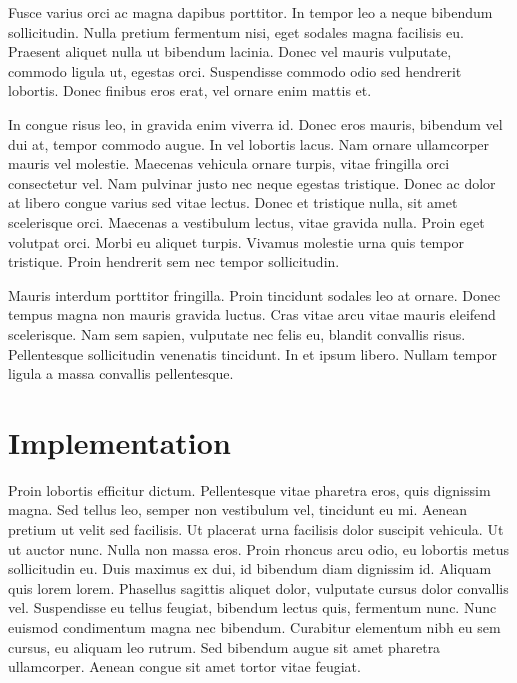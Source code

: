 \documentclass{article}
\begin{document}
Fusce varius orci ac magna dapibus porttitor. In tempor leo a neque bibendum sollicitudin. Nulla pretium fermentum nisi, eget sodales magna facilisis eu. Praesent aliquet nulla ut bibendum lacinia. Donec vel mauris vulputate, commodo ligula ut, egestas orci. Suspendisse commodo odio sed hendrerit lobortis. Donec finibus eros erat, vel ornare enim mattis et.

\begin{question}
	In congue risus leo, in gravida enim viverra id. Donec eros mauris, bibendum vel dui at, tempor commodo augue. In vel lobortis lacus. Nam ornare ullamcorper mauris vel molestie. Maecenas vehicula ornare turpis, vitae fringilla orci consectetur vel. Nam pulvinar justo nec neque egestas tristique. Donec ac dolor at libero congue varius sed vitae lectus. Donec et tristique nulla, sit amet scelerisque orci. Maecenas a vestibulum lectus, vitae gravida nulla. Proin eget volutpat orci. Morbi eu aliquet turpis. Vivamus molestie urna quis tempor tristique. Proin hendrerit sem nec tempor sollicitudin.
\end{question}

Mauris interdum porttitor fringilla. Proin tincidunt sodales leo at ornare. Donec tempus magna non mauris gravida luctus. Cras vitae arcu vitae mauris eleifend scelerisque. Nam sem sapien, vulputate nec felis eu, blandit convallis risus. Pellentesque sollicitudin venenatis tincidunt. In et ipsum libero. Nullam tempor ligula a massa convallis pellentesque.


\section{Implementation}

Proin lobortis efficitur dictum. Pellentesque vitae pharetra eros, quis dignissim magna. Sed tellus leo, semper non vestibulum vel, tincidunt eu mi. Aenean pretium ut velit sed facilisis. Ut placerat urna facilisis dolor suscipit vehicula. Ut ut auctor nunc. Nulla non massa eros. Proin rhoncus arcu odio, eu lobortis metus sollicitudin eu. Duis maximus ex dui, id bibendum diam dignissim id. Aliquam quis lorem lorem. Phasellus sagittis aliquet dolor, vulputate cursus dolor convallis vel. Suspendisse eu tellus feugiat, bibendum lectus quis, fermentum nunc. Nunc euismod condimentum magna nec bibendum. Curabitur elementum nibh eu sem cursus, eu aliquam leo rutrum. Sed bibendum augue sit amet pharetra ullamcorper. Aenean congue sit amet tortor vitae feugiat.
\end{document}
